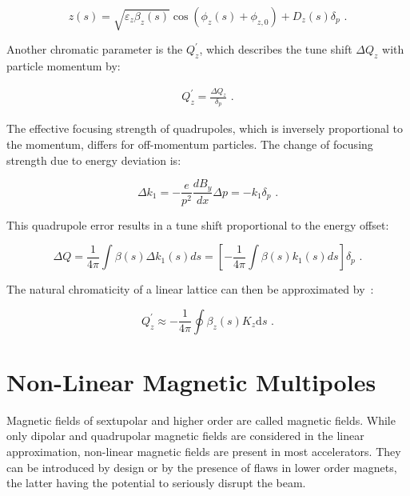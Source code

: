 \begin{equation}
    z(s) = \sqrt{\varepsilon_z \beta_z(s)} \cos \left( \phi_z(s) + \phi_{z, 0} \right) + D_z(s) \delta_p \text{ .}
    \label{equation:hill_solution_with_dispersion}
\end{equation}

Another chromatic parameter is the  \(Q_z^{\prime}\), which describes the tune shift \(\Delta Q_z\) with particle momentum by:

\begin{eqnarray}
    Q^{\prime}_z = \frac{\Delta Q_z}{\delta_p} \text{ .}
    \label{equation:chromaticity_definition}
\end{eqnarray}

The effective focusing strength of quadrupoles, which is inversely proportional to the momentum, differs for off-momentum particles.
The change of focusing strength due to energy deviation is:

\begin{equation}
	\Delta k_{1} = - \dfrac{e}{p^2} \dfrac{d B_{y}}{d x} \Delta p = -k_{1} \delta_p \text{ .}
    \label{equation:quadrupole_focusing_strength_deviation_from_dispersion}
\end{equation}

This quadrupole error results in a tune shift proportional to the energy offset:

\begin{equation}
	\Delta Q = \dfrac{1}{4 \pi} \int \beta(s) \Delta k_{1}(s) ds = \left[ - \frac{1}{4 \pi} \int \beta(s) k_{1}(s) ds \right] \delta_p \text{ .}
    \label{equation:tune_shift_from_dispersion}
\end{equation}

The natural chromaticity of a linear lattice can then be approximated by~\cite{CAS:Guiducci:Chromaticity}:

\begin{equation}
    Q_z^{\prime} \approx -\frac{1}{4 \pi} \oint \beta_z(s) K_z \mathrm{d}s \text{ .}
    \label{equation:natural_chromaticity_approximation}
\end{equation}

\section{Non-Linear Magnetic Multipoles}
\label{section:non_linear_magnetic_multipoles}

Magnetic fields of sextupolar and higher order are called  magnetic fields.
While only dipolar and quadrupolar magnetic fields are considered in the linear approximation, non-linear magnetic fields are present in most accelerators.
They can be introduced by design or by the presence of flaws in lower order magnets, the latter having the potential to seriously disrupt the beam.

